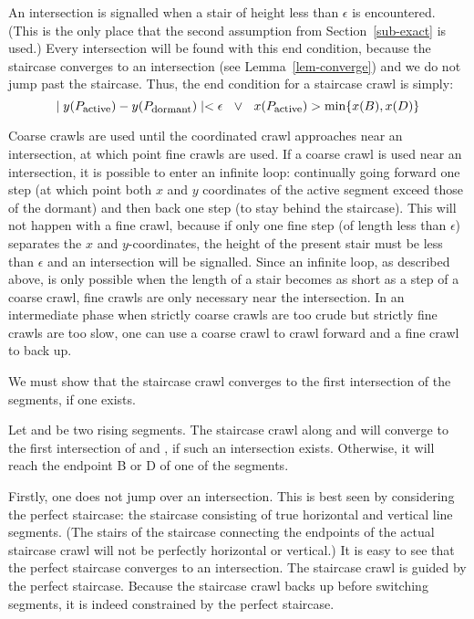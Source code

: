 
An intersection is signalled when a stair of height less than $\epsilon$ is 
encountered.
(This is the only place that the second assumption from Section~\ref{sub-exact}
is used.)
Every intersection will be found with this end condition, because the staircase converges
to an intersection (see Lemma~\ref{lem-converge}) and we do not jump past the staircase.
Thus, the end condition for a staircase crawl is simply:
\[ \mid y(P_{\mbox{\footnotesize{active}}}) - y(P_{\mbox{\footnotesize{dormant}}}) \mid 
	< \epsilon   \ \ \vee \ \ 
   x(P_{\mbox{\footnotesize{active}}}) > \mbox{min} \{x(B),x(D)\}
\]

Coarse crawls are used until the coordinated crawl approaches near an intersection,
at which point fine crawls are used.
If a coarse crawl is used near an intersection, it is possible to enter an infinite loop:
continually going forward one step (at which point both $x$ and $y$ 
coordinates of the active segment
exceed those of the dormant) and then back one step (to stay behind the staircase).  
This will not happen with a fine crawl, because if only one fine step (of length 
less than 
$\epsilon$) separates the $x$ and $y$-coordinates, 
the height of the present stair must be less 
than $\epsilon$ and an intersection will be signalled.
Since an infinite loop, as described above, 
is only possible when the length of a stair becomes 
as short as a step of a coarse crawl, fine crawls are only necessary near the 
intersection.
In an intermediate phase when strictly coarse crawls are too crude 
but strictly fine crawls are too slow, one can use a coarse crawl to crawl forward 
and a fine crawl to back up.

We must show that the staircase crawl converges to the first intersection of the segments,
if one exists.

\begin{lemma}
\label{lem-converge}
Let  and  be two rising segments.
The staircase crawl along  and  will converge
to the first intersection of \arc{AB} and \arc{CD}, if such an 
intersection exists.
Otherwise, it will reach the endpoint B or D of one of the segments.
\end{lemma}
Firstly, one does not jump over an intersection.
This is best seen by considering the perfect staircase: the staircase consisting of true
horizontal and vertical line segments. %
(The stairs of the staircase connecting the endpoints of the actual staircase crawl 
will not be perfectly horizontal or vertical.)
It is easy to see that the perfect staircase converges to an intersection.
The staircase crawl is guided by the perfect staircase.
Because the staircase crawl backs up before switching segments, it is indeed constrained by 
the perfect staircase.

